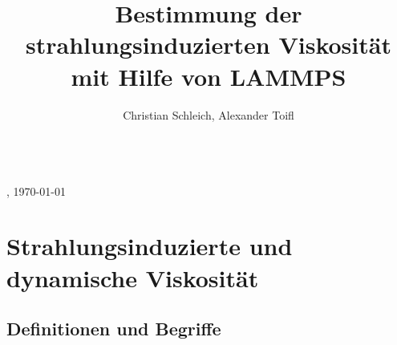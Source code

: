 \documentclass[a4paper, 10pt, 
               numbers=noenddot, toc=graduated,
               headsepline=true, footsepline=true,
               twoside=false, titlepage=true, 
               bibliography=totoc]{scrartcl}
\begin{document}
\title{Bestimmung der strahlungsinduzierten Viskosit{\"a}t mit Hilfe von LAMMPS}
\author{Christian Schleich, Alexander Toifl}

\begin{center}
\huge{\thetitle} \\
\small{\theauthor, \today}
\end{center}

\hspace{1 cm}


\section{Strahlungsinduzierte und dynamische Viskosität}

\subsection{Definitionen und Begriffe}
\end{document}
